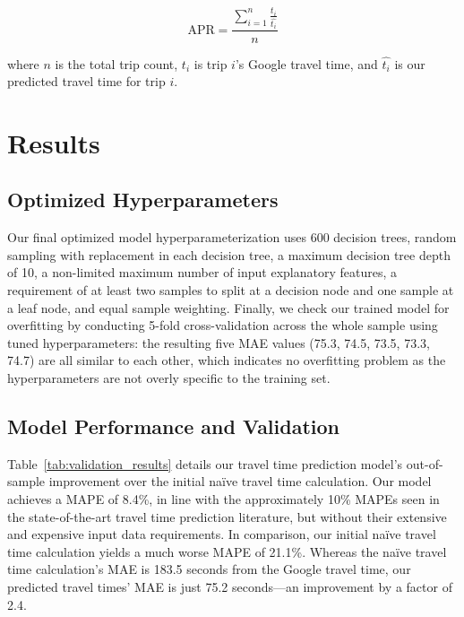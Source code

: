 \documentclass[12pt,letterpaper]{article} %
\begin{document}
\begin{equation}
\label{eq:apr}
\text{APR} = \frac{\sum^{n}_{i=1}\frac{t_i}{\hat{t_i}}}{n}
\end{equation}

where $n$ is the total trip count, $t_i$ is trip $i$'s Google travel time, and $\hat{t_i}$ is our predicted travel time for trip $i$.

\section{Results}

\subsection{Optimized Hyperparameters}

Our final optimized model hyperparameterization uses 600 decision trees, random sampling with replacement in each decision tree, a maximum decision tree depth of 10, a non-limited maximum number of input explanatory features, a requirement of at least two samples to split at a decision node and one sample at a leaf node, and equal sample weighting. Finally, we check our trained model for overfitting by conducting 5-fold cross-validation across the whole sample using tuned hyperparameters: the resulting five MAE values (75.3, 74.5, 73.5, 73.3, 74.7) are all similar to each other, which indicates no overfitting problem as the hyperparameters are not overly specific to the training set.

\subsection{Model Performance and Validation}

Table~\ref{tab:validation_results} details our travel time prediction model's out-of-sample improvement over the initial naïve travel time calculation. Our model achieves a MAPE of 8.4\%, in line with the approximately 10\% MAPEs seen in the state-of-the-art travel time prediction literature, but without their extensive and expensive input data requirements. In comparison, our initial naïve travel time calculation yields a much worse MAPE of 21.1\%. Whereas the naïve travel time calculation's MAE is 183.5 seconds from the Google travel time, our predicted travel times' MAE is just 75.2 seconds---an improvement by a factor of 2.4.
\end{document}
